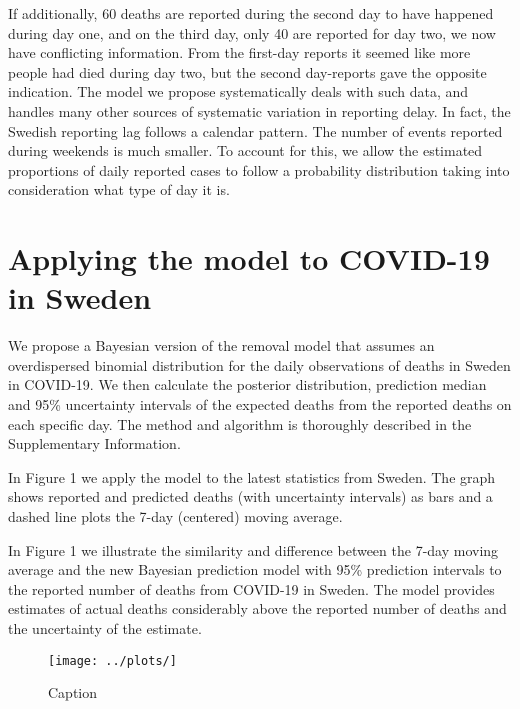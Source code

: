 \documentclass[a4paper,11pt,article,oneside,openany,american]{memoir}
\begin{document}
If additionally, 60 deaths are reported during the second day to have happened during day one, and on the third day, only 40 are reported for day two, we now have conflicting information. From the first-day reports it seemed like more people had died during day two, but the second day-reports gave the opposite indication. The model we propose systematically deals with such data, and handles many other sources of systematic variation in reporting delay. In fact, the Swedish reporting lag follows a calendar pattern. The number of events reported during weekends is much smaller. To account for this, we allow the estimated proportions of daily reported cases to follow a probability distribution taking into consideration what type of day it is.

\chapter{Applying the model to COVID-19 in Sweden}
We propose a Bayesian version of the removal model that assumes an overdispersed binomial distribution for the daily observations of deaths in Sweden in COVID-19. We then calculate the posterior distribution, prediction median and 95\% uncertainty intervals of the expected deaths from the reported deaths on each specific day. The method and algorithm is thoroughly described in the Supplementary Information.

In Figure 1 we apply the model to the latest statistics from Sweden. The graph shows reported and predicted deaths (with uncertainty intervals) as bars and a dashed line plots the 7-day (centered) moving average.

In Figure 1 we illustrate the similarity and difference between the 7-day moving average and the new Bayesian prediction model with 95\% prediction intervals to the reported number of deaths from COVID-19 in Sweden. The model provides estimates of actual deaths considerably above the reported number of deaths and the uncertainty of the estimate.

\begin{figure}
    \centering
    \texttt{[image: ../plots/]}
    \caption{Caption}
    \label{fig:my_label}
\end{figure}

\end{document}
